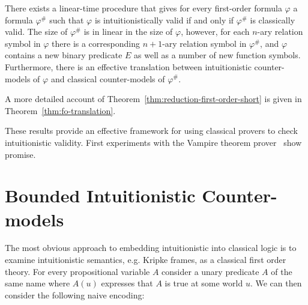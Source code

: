 \documentclass[runningheads]{llncs}
\begin{document}
\begin{theorem}
\label{thm:reduction-first-order-short}
There exists a linear-time procedure that gives for every first-order formula $\varphi$ a formula $\varphi^\#$ such that $\varphi$ is intuitionistically valid if and only if $\varphi^\#$ is classically valid. The size of $\varphi^\#$ is in linear in the size of $\varphi$, however, for each $n$-ary relation symbol in $\varphi$ there is a corresponding $n+1$-ary relation symbol in $\varphi^\#$, and $\varphi$ contains a new binary predicate $E$ as well as a number of new function symbols. Furthermore, there is an effective translation between intuitionistic counter-models of $\varphi$ and classical counter-models of $\varphi^\#$.
\end{theorem}
A more detailed account of Theorem~\ref{thm:reduction-first-order-short} is given in Theorem~\ref{thm:fo-translation}.

These results provide an effective framework for using classical provers to check intuitionistic validity. First experiments with the Vampire theorem prover~\cite{kovacs2013first} show promise.




\section{Bounded Intuitionistic Counter-models}

The most obvious approach to embedding intuitionistic into classical logic is to examine intuitionistic semantics, e.g. Kripke frames, as a classical first order theory. For every propositional variable $A$ consider a unary predicate $A$ of the same name where $A(u)$ expresses that $A$ is true at some world $u$. We can then consider the following naive encoding:
\end{document}
